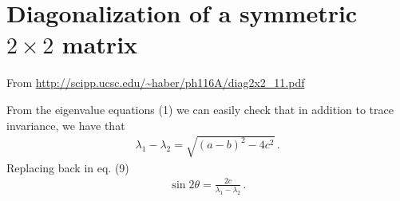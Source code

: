 
\section{Diagonalization of a symmetric $2\times 2$ matrix}

From \url{http://scipp.ucsc.edu/~haber/ph116A/diag2x2_11.pdf}





From the eigenvalue equations (1) we can easily check that in addition to trace invariance, we have that 
\begin{align}
  \lambda_1-\lambda_2=\sqrt{\left( a-b \right)^2-4c^2}\,.
\end{align}
Replacing back in eq. (9)
\begin{align}
  \sin2\theta=\frac{2c}{\lambda_1-\lambda_2}\,.
\end{align}



